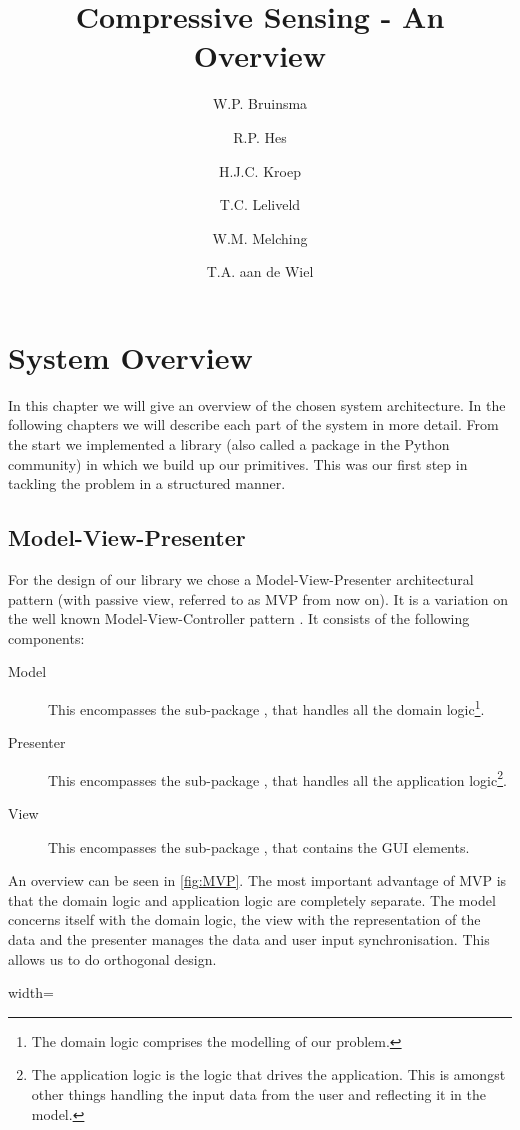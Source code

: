 \documentclass[a4paper, openany, oneside]{memoir}
\title{Compressive Sensing - An Overview}
\author{W.P. Bruinsma \and R.P. Hes \and H.J.C. Kroep \and T.C. Leliveld \and W.M. Melching \and T.A. aan de Wiel}
\begin{document}
\chapter{System Overview}
In this chapter we will give an overview of the chosen system architecture. In the following chapters we will describe each part of the system in more detail. From the start we implemented a library (also called a package in the Python community) in which we build up our primitives. This was our first step in tackling the problem in a structured manner.

\section{Model-View-Presenter}
\label{sec:model-view-presenter}
For the design of our library we chose a Model-View-Presenter architectural pattern (with passive view, referred to as MVP from now on). It is a variation on the well known Model-View-Controller pattern \cite{syromiatnikov2014journey}. It consists of the following components:
\begin{description}
    \item[Model] This encompasses the sub-package , that handles all the domain logic\footnote{The domain logic comprises the modelling of our problem.}.
    \item[Presenter] This encompasses the sub-package , that handles all the application logic\footnote{The application logic is the logic that drives the application. This is amongst other things handling the input data from the user and reflecting it in the model.}.
    \item[View] This encompasses the sub-package , that contains the GUI elements.
\end{description}
An overview can be seen in \cref{fig:MVP}. The most important advantage of MVP is that the domain logic and application logic are completely separate. The model concerns itself with the domain logic, the view with the representation of the data and the presenter manages the data and user input synchronisation. This allows us to do orthogonal design.

\begin{figure*}
    \centering
	\begin{adjustbox}{width=\textwidth}
    
    \end{adjustbox}
    \caption{Illustration of the MVP pattern as an hierarchical way of separating our system.}
    \label{fig:MVP}
\end{figure*}
\end{document}
